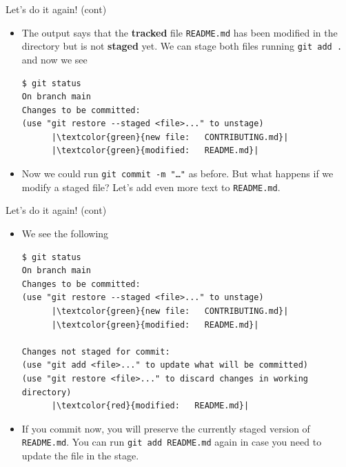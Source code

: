 \documentclass[
hyperref={bookmarks=false},
xcolor={dvipsnames,svgnames*,x11names*}, 
12pt
]{beamer}
\begin{document}
\begin{frame}[fragile]{Let's do it again! (cont)}
\vspace{-0.5cm}
\begin{itemize}
\itemsep 2ex
\item The output says that the \textbf{tracked} file \texttt{README.md} has been modified in the directory but is not \textbf{staged} yet. We can stage both files running \texttt{git add .} and now we see
\begin{lstlisting}
$ git status
On branch main
Changes to be committed:
(use "git restore --staged <file>..." to unstage)
      |\textcolor{green}{new file:   CONTRIBUTING.md}|
      |\textcolor{green}{modified:   README.md}|
\end{lstlisting}

\item Now we could run \texttt{git commit -m "\dots"} as before. But what happens if we modify a staged file? Let's add even more text to \texttt{README.md}. 
\end{itemize}
\end{frame}

\begin{frame}[fragile]{Let's do it again! (cont)}
\vspace{-0.5cm}
\begin{itemize}
\itemsep 2ex
\item We see the following
\begin{lstlisting}
$ git status
On branch main
Changes to be committed:
(use "git restore --staged <file>..." to unstage)
      |\textcolor{green}{new file:   CONTRIBUTING.md}|
      |\textcolor{green}{modified:   README.md}|

Changes not staged for commit:
(use "git add <file>..." to update what will be committed)
(use "git restore <file>..." to discard changes in working directory)
      |\textcolor{red}{modified:   README.md}|
\end{lstlisting}
\item If you commit now, you will preserve the currently staged version of \texttt{README.md}. You can run \texttt{git add README.md} again in case you need to update the file in the stage. 
\end{itemize}
\end{frame}
\end{document}
